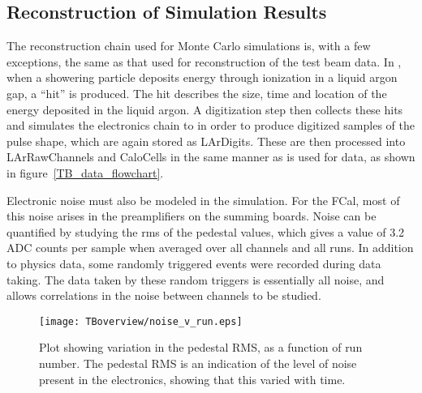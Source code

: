 %





\subsection{Reconstruction of Simulation Results}
The reconstruction chain used for Monte Carlo simulations is, with a few exceptions, the same as that used for reconstruction of the test beam data. In \geant, when a showering particle deposits energy through ionization in a liquid argon gap, a ``hit'' is produced. The hit describes the size, time and location of the energy deposited in the liquid argon. A digitization step then collects these hits and simulates the electronics chain to in order to produce digitized samples of the pulse shape, which are again stored as LArDigits. These are then processed into LArRawChannels and CaloCells in the same manner as is used for data, as shown in figure~\ref{TB_data_flowchart}.


Electronic noise must also be modeled in the simulation. For the FCal, most of this noise arises in the preamplifiers on the summing boards. Noise can be quantified by studying the rms of the pedestal values, which gives a value of 3.2 ADC counts per sample when averaged over all channels and all runs. In addition to physics data, some randomly triggered events were recorded during data taking. The data taken by these random triggers is essentially all noise, and allows correlations in the noise between channels to be studied.

\begin{figure}[bht]
\begin{center}
\texttt{[image: TBoverview/noise\_v\_run.eps]}
\end{center}
\caption{Plot showing variation in the pedestal RMS, as a function of run number. The pedestal RMS is an indication of the level of noise present in the electronics, showing that this varied with time.}
\label{pedestal_variation}
\end{figure}

